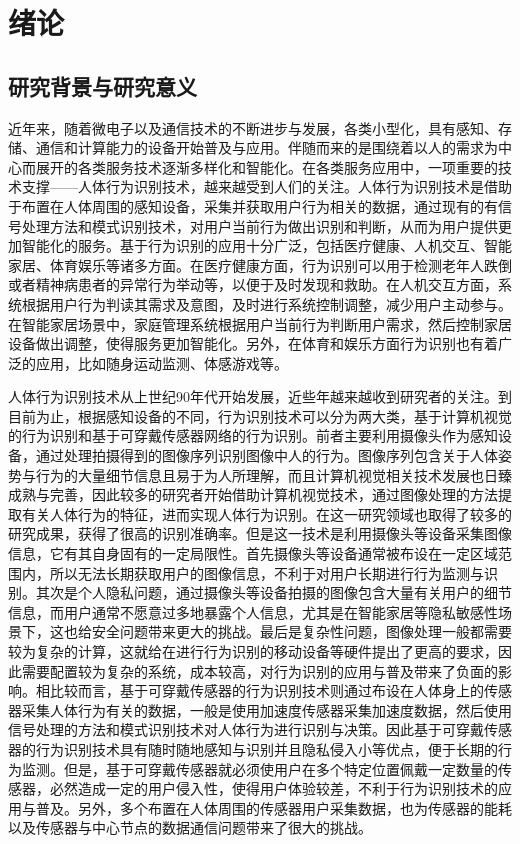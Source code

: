 \chapter{绪论}

\section{研究背景与研究意义}
\par 近年来，随着微电子以及通信技术的不断进步与发展，各类小型化，具有感知、存储、通信和计算能力的设备开始普及与应用。伴随而来的是围绕着以人的需求为中心而展开的各类服务技术逐渐多样化和智能化。在各类服务应用中，一项重要的技术支撑——人体行为识别技术，越来越受到人们的关注。人体行为识别技术是借助于布置在人体周围的感知设备，采集并获取用户行为相关的数据，通过现有的有信号处理方法和模式识别技术，对用户当前行为做出识别和判断，从而为用户提供更加智能化的服务。基于行为识别的应用十分广泛，包括医疗健康、人机交互、智能家居、体育娱乐等诸多方面。在医疗健康方面，行为识别可以用于检测老年人跌倒或者精神病患者的异常行为举动等，以便于及时发现和救助。在人机交互方面，系统根据用户行为判读其需求及意图，及时进行系统控制调整，减少用户主动参与。在智能家居场景中，家庭管理系统根据用户当前行为判断用户需求，然后控制家居设备做出调整，使得服务更加智能化。另外，在体育和娱乐方面行为识别也有着广泛的应用，比如随身运动监测、体感游戏等。

\par 人体行为识别技术从上世纪90年代开始发展\cite{surveyOnSensors}，近些年越来越收到研究者的关注。到目前为止，根据感知设备的不同，行为识别技术可以分为两大类，基于计算机视觉的行为识别和基于可穿戴传感器网络的行为识别。前者主要利用摄像头作为感知设备，通过处理拍摄得到的图像序列识别图像中人的行为\cite{surveyOnVision}。图像序列包含关于人体姿势与行为的大量细节信息且易于为人所理解，而且计算机视觉相关技术发展也日臻成熟与完善，因此较多的研究者开始借助计算机视觉技术，通过图像处理的方法提取有关人体行为的特征，进而实现人体行为识别。在这一研究领域也取得了较多的研究成果，获得了很高的识别准确率。但是这一技术是利用摄像头等设备采集图像信息，它有其自身固有的一定局限性。首先摄像头等设备通常被布设在一定区域范围内，所以无法长期获取用户的图像信息，不利于对用户长期进行行为监测与识别。其次是个人隐私问题，通过摄像头等设备拍摄的图像包含大量有关用户的细节信息，而用户通常不愿意过多地暴露个人信息，尤其是在智能家居等隐私敏感性场景下，这也给安全问题带来更大的挑战。最后是复杂性问题，图像处理一般都需要较为复杂的计算，这就给在进行行为识别的移动设备等硬件提出了更高的要求，因此需要配置较为复杂的系统，成本较高，对行为识别的应用与普及带来了负面的影响。相比较而言，基于可穿戴传感器的行为识别技术\cite{sensorBased}则通过布设在人体身上的传感器采集人体行为有关的数据，一般是使用加速度传感器采集加速度数据，然后使用信号处理的方法和模式识别技术对人体行为进行识别与决策。因此基于可穿戴传感器的行为识别技术具有随时随地感知与识别并且隐私侵入小等优点，便于长期的行为监测。但是，基于可穿戴传感器就必须使用户在多个特定位置佩戴一定数量的传感器，必然造成一定的用户侵入性，使得用户体验较差，不利于行为识别技术的应用与普及。另外，多个布置在人体周围的传感器用户采集数据，也为传感器的能耗以及传感器与中心节点的数据通信问题带来了很大的挑战。


